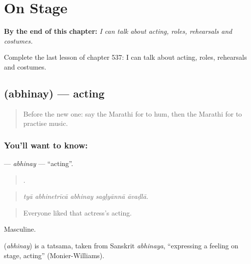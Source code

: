 
\chapter{On Stage}
\label{ch:mr-on-stage}

\begin{chapteropening}
\textbf{By the end of this chapter:} \emph{I can talk about acting, roles, rehearsals and costumes.}

Complete the last lesson of chapter 537: I can talk about acting, roles, rehearsals and costumes.
\end{chapteropening}

\section[\texorpdfstring{\mr{अभिनय} (abhinay)}{अभिनय (abhinay)}]{ (abhinay) — acting}

\label{lesson:MR-C537-abhinay}



\begin{quote}
Before the new one: say the Marathi for to hum, then the Marathi for to practise music.
\end{quote}

\subsection*{You'll want to know: }
\textbf{} — \emph{abhinay} — \textquotedblleft{}acting\textquotedblright{}.

\begin{quote}
    .
\end{quote}

\begin{quote}
\emph{tyā abhinetrīcā abhinay sagḷyānnā āvaḍlā.}
\end{quote}

\begin{quote}
Everyone liked that actress's acting.
\end{quote}

Masculine.

\begin{cousinweb}
\textbf{} (\emph{abhinay}) is a tatsama, taken from Sanskrit \emph{abhinaya}, \textquotedblleft{}expressing a feeling on stage, acting\textquotedblright{} (Monier-Williams).
\end{cousinweb}


